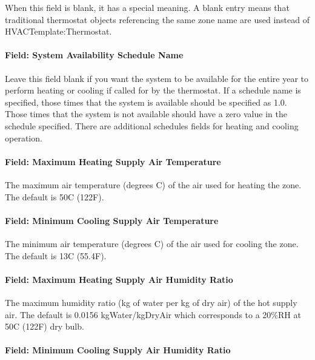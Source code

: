 When this field is blank, it has a special meaning. A blank entry means that traditional thermostat objects referencing the same zone name are used instead of HVACTemplate:Thermostat.

\paragraph{Field: System Availability Schedule Name}\label{field-system-availability-schedule-name}

Leave this field blank if you want the system to be available for the entire year to perform heating or cooling if called for by the thermostat. If a schedule name is specified, those times that the system is available should be specified as 1.0. Those times that the system is not available should have a zero value in the schedule specified. There are additional schedules fields for heating and cooling operation.

\paragraph{Field: Maximum Heating Supply Air Temperature}\label{field-maximum-heating-supply-air-temperature}

The maximum air temperature (degrees C) of the air used for heating the zone. The default is 50C (122F).

\paragraph{Field: Minimum Cooling Supply Air Temperature}\label{field-minimum-cooling-supply-air-temperature}

The minimum air temperature (degrees C) of the air used for cooling the zone. The default is 13C (55.4F).

\paragraph{Field: Maximum Heating Supply Air Humidity Ratio}\label{field-maximum-heating-supply-air-humidity-ratio}

The maximum humidity ratio (kg of water per kg of dry air) of the hot supply air. The default is 0.0156 kgWater/kgDryAir which corresponds to a 20\%RH at 50C (122F) dry bulb.

\paragraph{Field: Minimum Cooling Supply Air Humidity Ratio}\label{field-minimum-cooling-supply-air-humidity-ratio}

